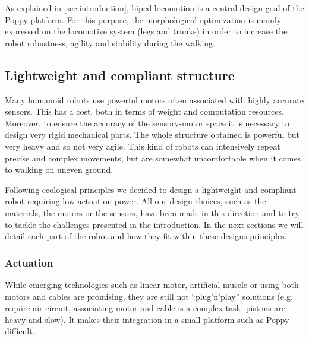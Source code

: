 As explained in \ref{sec:introduction}, biped locomotion is a central design goal of the Poppy platform.
For this purpose, the morphological optimization is mainly expressed on the locomotive system (legs and trunks) in order to increase the robot robustness, agility and stability during the walking.


\subsection{Lightweight and compliant structure} %
\label{sub:a_ligthweight_and_compliant_structre}
Many humanoid robots use powerful motors often associated with highly accurate sensors.
This has a cost, both in terms of weight and computation resources.
Moreover, to ensure the accuracy of the sensory-motor space it is necessary to design very rigid mechanical parts.
The whole structure obtained is powerful but very heavy and so not very agile.
This kind of robots can intensively repeat precise and complex movements, but are somewhat uncomfortable when it comes to walking on uneven ground.

Following ecological principles \cite{pfeifer2005new} we decided to design a lightweight and compliant robot requiring low actuation power.
All our design choices, such as the materials, the motors or the sensors, have been made in this direction and to try to tackle the challenges presented in the introduction.
In the next sections we will detail each part of the robot and how they fit within these designs principles.

\subsubsection{Actuation} %
\label{ssub:robot_actuation}

While emerging technologies such as linear motor, artificial muscle or using both motors and cables are promising, they are still not ``plug'n'play'' solutions (e.g.
require air circuit, associating motor and cable is a complex task, pistons are heavy and slow).
It makes their integration in a small platform such as Poppy difficult.

